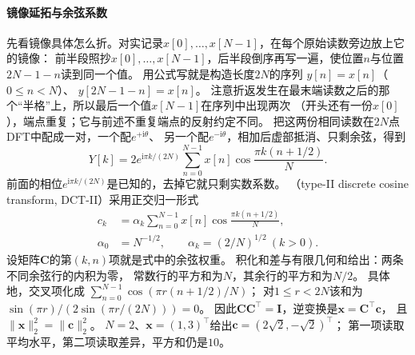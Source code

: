 \paragraph{镜像延拓与余弦系数}
先看镜像具体怎么折。对实记录$x[0],\ldots,x[N-1]$，在每个原始读数旁边放上它的镜像：
前半段照抄$x[0],\ldots,x[N-1]$，后半段倒序再写一遍，使位置$n$与位置$2N-1-n$读到同一个值。
用公式写就是构造长度$2N$的序列
$y[n]=x[n]$（$0\leq n<N$）、
$y[2N-1-n]=x[n]$。
注意折返发生在最末端读数之后的那个“半格”上，所以最后一个值$x[N-1]$在序列中出现两次
（开头还有一份$x[0]$），端点重复；它与前述不重复端点的反射约定不同。
把这两份相同读数在$2N$点DFT中配成一对，一个配$e^{+\mathrm i\theta}$、
另一个配$e^{-\mathrm i\theta}$，相加后虚部抵消、只剩余弦，得到
\[
 Y[k]=2e^{\mathrm i\pi k/(2N)}
 \sum_{n=0}^{N-1}x[n]\cos\frac{\pi k(n+1/2)}N .
\]
前面的相位$e^{\mathrm i\pi k/(2N)}$是已知的，去掉它就只剩实数系数。
（type-II discrete cosine transform, DCT-II）采用正交归一形式
\begin{equation}
 \begin{aligned}
 c_k&=\alpha_k\sum_{n=0}^{N-1}x[n]
 \cos\frac{\pi k(n+1/2)}N,\\
 \alpha_0&=N^{-1/2},\qquad \alpha_k=(2/N)^{1/2}\ (k>0).
 \end{aligned}
 \label{eq:signal-dct-two}
\end{equation}
设矩阵$\bm C$的第$(k,n)$项就是式中的余弦权重。
积化和差与有限几何和给出：两条不同余弦行的内积为零，
常数行的平方和为$N$，其余行的平方和为$N/2$。
具体地，交叉项化成
$\sum_{n=0}^{N-1}\cos(\pi r(n+1/2)/N)$；
对$1\leq r<2N$该和为$\sin(\pi r)/(2\sin(\pi r/(2N)))=0$。
因此$\bm C\bm C^\top=\bm I$，逆变换是$\bm x=\bm C^\top\bm c$，
且$\|\bm x\|_2^2=\|\bm c\|_2^2$。
$N=2$、$\bm x=(1,3)^\top$给出$\bm c=(2\sqrt2,-\sqrt2)^\top$；
第一项读取平均水平，第二项读取差异，平方和仍是$10$。

